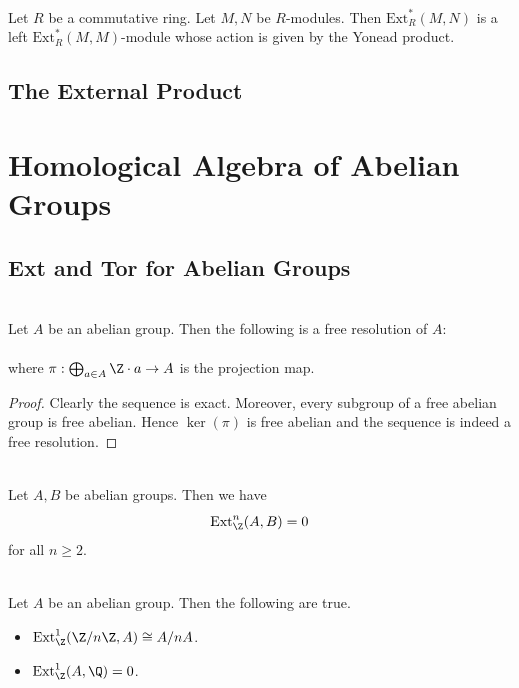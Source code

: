 \documentclass[a4paper]{article}
\begin{document}
\begin{prp}{}{}\\
Let $R$ be a commutative ring. Let $M,N$ be $R$-modules. Then $\text{Ext}_R^\ast(M,N)$ is a left $\text{Ext}_R^\ast(M,M)$-module whose action is given by the Yonead product. 
\end{prp}

\subsection{The External Product}

\pagebreak
\section{Homological Algebra of Abelian Groups}
\subsection{Ext and Tor for Abelian Groups}
\begin{lmm}{}{}\\
Let $A$ be an abelian group. Then the following is a free resolution of $A$: \\
\\
where $\pi:\bigoplus_{a\in A}\Z\cdot a\to A$ is the projection map. 
\begin{proof}
Clearly the sequence is exact. Moreover, every subgroup of a free abelian group is free abelian. Hence $\ker(\pi)$ is free abelian and the sequence is indeed a free resolution. 
\end{proof}
\end{lmm}

\begin{prp}{}{}\\
Let $A,B$ be abelian groups. Then we have $$\text{Ext}_\Z^n(A,B)=0$$ for all $n\geq 2$. 
\end{prp}

\begin{prp}{}{}\\
Let $A$ be an abelian group. Then the following are true. 
\begin{itemize}
\item $\text{Ext}_\Z^1(\Z/n\Z,A)\cong A/nA$. 
\item $\text{Ext}_\Z^1(A,\Q)=0$. 
\end{itemize} 
\end{prp}
\end{document}
